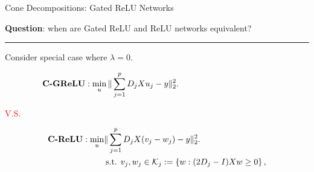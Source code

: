 \documentclass[usenames,dvipsnames,mathserif,notheorems]{beamer}
\newcommand{\horizontalrule}{
	{
			\vspace{-0.5em}
			\center \rule{\textwidth}{0.1em}
			\vspace{-0.2em}
		}
}
\newcommand{\red}[1]{\textcolor{Red}{#1}}
\begin{document}
\begin{frame}{Cone Decompositions: Gated ReLU Networks }

	\begin{center}
		\textbf{Question}: when are Gated ReLU and ReLU networks equivalent?
	\end{center}

	\pause
	\horizontalrule

	Consider special case where \( \lambda = 0 \).

	\[
		\textbf{C-GReLU}: \min_{u} \norm{\sum_{j=1}^p D_j X u_j - y}_2^2. \hspace{11em}
	\]
	\vspace{-1em}

	\begin{center}
		\Large \red{V.S.}
	\end{center}

	\vspace{-2em}
	\[
		\begin{aligned}
			\textbf{C-ReLU}: \min_{u} & \|\sum_{j=1}^p D_j X (v_j - w_j) - y\|_2^2. \\
			                          & \hspace{0.2em} \text{s.t. }
			v_j, w_j \in \mathcal{K}_j := \left\{w : (2D_j - I) X w \geq 0\right\},
		\end{aligned}
	\]

\end{frame}
\end{document}
